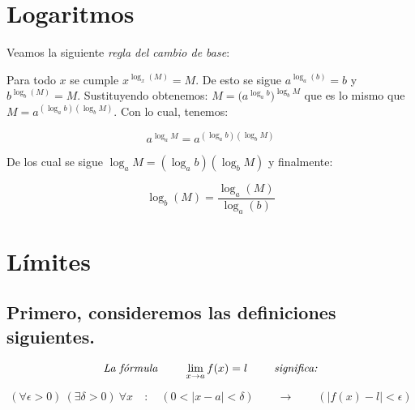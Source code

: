 \documentclass[14pt,a4paper]{extarticle}
\begin{document}
\section{Logaritmos}
Veamos la siguiente \emph{regla del cambio de base}:

Para todo \( x \)  se cumple \( x^{\log_x(M)} = M \). De esto se sigue
\( a^{\log_a(b)} = b \) y \( b^{\log_b(M)} = M \). Sustituyendo
obtenemos: \(M= \big(a^{\log_a b}\big)^{\log_b M} \) que es lo mismo que
\(M= a^{(\log_a b)(\log_b M)}   \). Con lo cual, tenemos:


\[a^{\log_a M} = a^{(\log_a b)(\log_b M)} \]

De los cual se sigue \( \log_a M = (\log_a b)(\log_b M) \)  y
finalmente:

\begin{equation}
\log_b(M) = \frac{\log_a(M)}{\log_a(b)}
\end{equation}


\section{L\'imites}

\subsection{Primero, consideremos las definiciones siguientes.}
\begin{mydef}[L\'imite]
\[\emph{La f\'ormula }  \qquad \lim_{x \to a}f(x) = l \qquad \emph{ significa:}\]

\begin{equation}
(\forall \epsilon > 0) \ (\exists \delta > 0) \ \forall x \quad : \quad (0<|x-a|<
\delta)
\qquad  \to \qquad ( |f(x) - l| < \epsilon   )
\end{equation}
\end{mydef}
\end{document}
